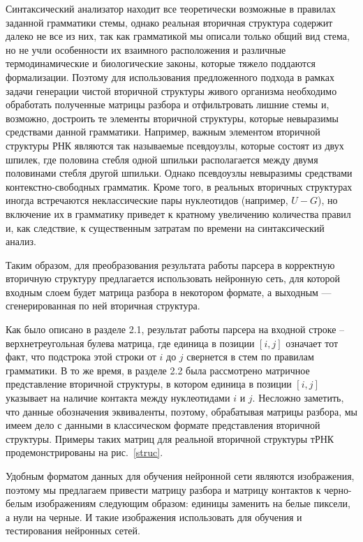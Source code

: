 \documentclass[14pt]{matmex-diploma-custom}
\begin{document}
Синтаксический анализатор находит все теоретически возможные в правилах заданной грамматики стемы, однако реальная вторичная структура содержит далеко не все из них, так как грамматикой мы описали только общий вид стема, но не учли особенности их взаимного расположения и различные термодинамические и биологические законы, которые тяжело поддаются формализации. Поэтому для использования предложенного подхода в рамках задачи генерации чистой вторичной структуры живого организма необходимо обработать полученные матрицы разбора и отфильтровать лишние стемы и, возможно, достроить те элементы вторичной структуры, которые невыразимы средствами данной грамматики. Например, важным элементом вторичной структуры РНК являются так называемые псевдоузлы, которые состоят из двух шпилек, где половина стебля одной шпильки располагается между двумя половинами стебля другой шпильки. Однако псевдоузлы невыразимы средствами контекстно-свободных грамматик. Кроме того, в реальных вторичных структурах иногда встречаются неклассические пары нуклеотидов (например, $U-G$), но включение их в грамматику приведет к кратному увеличению количества правил и, как следствие, к существенным затратам по времени на синтаксический анализ.

Таким образом, для преобразования результата работы парсера в корректную вторичную структуру предлагается использовать нейронную сеть, для которой входным слоем будет матрица разбора в некотором формате, а выходным --- сгенерированная по ней вторичная структура.

Как было описано в разделе 2.1, результат работы парсера на входной строке -- верхнетреугольная булева матрица, где единица в позиции $[i,j]$ означает тот факт, что подстрока этой строки от $i$ до $j$ свернется в стем по правилам грамматики. В то же время, в разделе 2.2 была рассмотрено матричное представление вторичной структуры, в котором единица в позиции $[i,j]$ указывает на наличие контакта между нуклеотидами $i$ и $j$. Несложно заметить, что данные обозначения эквиваленты, поэтому, обрабатывая матрицы разбора, мы имеем дело с данными в классическом формате представления вторичной структуры. Примеры таких матриц для реальной вторичной структуры тРНК продемонстрированы на рис.~\ref{struc}.

Удобным форматом данных для обучения нейронной сети являются изображения, поэтому мы предлагаем привести матрицу разбора и матрицу контактов к черно-белым изображениям следующим образом: единицы заменить на белые пиксели, а нули на черные. И такие изображения использовать для обучения и тестирования нейронных сетей.
\end{document}
